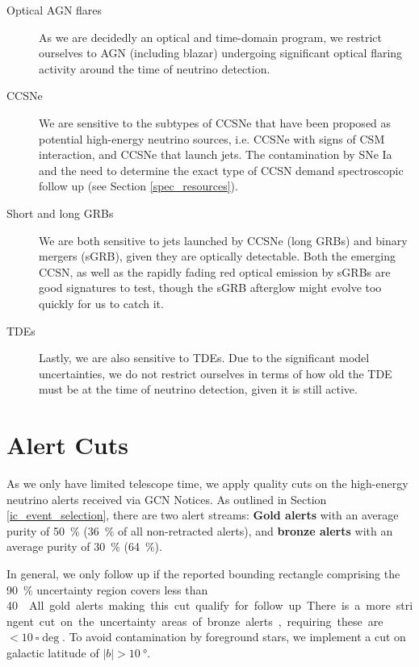 \begin{description}
    \item[Optical AGN flares] As we are decidedly an optical and time-domain program, we restrict ourselves to AGN (including blazar) undergoing significant optical flaring activity around the time of neutrino detection.
    \item[CCSNe] We are sensitive to the subtypes of CCSNe that have been proposed as potential high-energy neutrino sources, i.e. CCSNe with signs of CSM interaction, and CCSNe that launch jets. The contamination by SNe Ia and the need to determine the exact type of CCSN demand spectroscopic follow up (see Section \ref{spec_resources}).
    \item[Short and long GRBs] We are both sensitive to jets launched by CCSNe (long GRBs) and binary mergers (sGRB), given they are optically detectable. Both the emerging CCSN, as well as the rapidly fading red optical emission by sGRBs are good signatures to test, though the sGRB afterglow might evolve too quickly for us to catch it.
    \item[TDEs] Lastly, we are also sensitive to TDEs. Due to the significant model uncertainties, we do not restrict ourselves in terms of how old the TDE must be at the time of neutrino detection, given it is still active.
\end{description}


\section{Alert Cuts}\label{alert_cuts}
As we only have limited telescope time, we apply quality cuts on the high-energy neutrino alerts received via GCN Notices. As outlined in Section \ref{ic_event_selection}, there are two alert streams: \textbf{Gold alerts} with an average purity of \SI{50}{\percent} (\SI{36}{\percent} of all non-retracted alerts), and \textbf{bronze alerts} with an average purity of \SI{30}{\percent} (\SI{64}{\percent}).

In general, we only follow up if the reported bounding rectangle comprising the \SI{90}{\percent} uncertainty region covers less than \SI{40}{\square\deg}. All gold alerts making this cut qualify for follow up. There is a more stringent cut on the uncertainty areas of bronze alerts, requiring these are $<\SI{10}{\square\deg}$. To avoid contamination by foreground stars, we implement a cut on galactic latitude of $|b|>\SI{10}{\degree}$.


